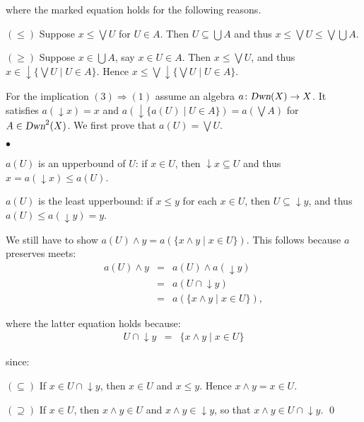 \documentclass{LMCS}
\newcommand{\Dwn}{\textsl{Dwn}\xspace}
\newcommand{\set}[2]{\{#1\;|\;#2\}}
\newcommand{\conjun}{\mathrel{\wedge}}
\newcommand{\downset}{\mathop{\downarrow}\!}
\begin{document}
{\noindent where the marked equation holds for the following
reasons.

$(\leq)$ Suppose $x\leq \bigvee U$ for $U\in A$. Then $U\subseteq
\bigcup A$ and thus $x \leq \bigvee U \leq \bigvee \bigcup A$.

$(\geq)$ Suppose $x\in\bigcup A$, say $x\in U\in A$. Then
$x \leq \bigvee U$, and thus $x\in \downset\set{\bigvee U}{U\in A}$.
Hence $x\leq \bigvee\downset\set{\bigvee U}{U\in A}$.

For the implication $(3)\Rightarrow(1)$ assume an algebra
$a\colon\Dwn(X) \rightarrow X$. It satisfies $a(\downset x) = x$ and
$a(\downset\set{a(U)}{U\in A}) = a(\bigvee A)$ for $A\in\Dwn^{2}(X)$.
We first prove that $a(U) = \bigvee U$.
\begin{iteMize}{$\bullet$}
\item $a(U)$ is an upperbound of $U$: if $x\in U$, then $\downset x
\subseteq U$ and thus $x = a(\downset x) \leq a(U)$.

\item $a(U)$ is the least upperbound: if $x\leq y$ for each $x\in U$,
then $U\subseteq\downset y$, and thus $a(U) \leq a(\downset y) = y$.
\end{iteMize}

We still have to show $a(U) \conjun y = a(\set{x\conjun y}{x\in U})$.
This follows because $a$ preserves meets:
$$\begin{array}{rcl}
a(U) \conjun y
& = &
a(U) \conjun a(\downset y) \\
& = &
a(U \cap \downset y) \\
& = &
a(\set{x\conjun y}{x\in U}),
\end{array}$$

\noindent where the latter equation holds because:
$$\begin{array}{rcl}
U \cap \downset y
& = &
\set{x\conjun y}{x\in U}
\end{array}$$

\noindent since:

$(\subseteq)$ If $x\in U \cap \downset y$, then $x\in U$ and
$x \leq y$. Hence $x \conjun y = x\in U$.

$(\supseteq)$ If $x\in U$, then $x\conjun y\in U$ and $x\conjun y
\in \downset y$, so that $x\conjun y \in U \cap \downset y$. \qed
}
\end{document}
